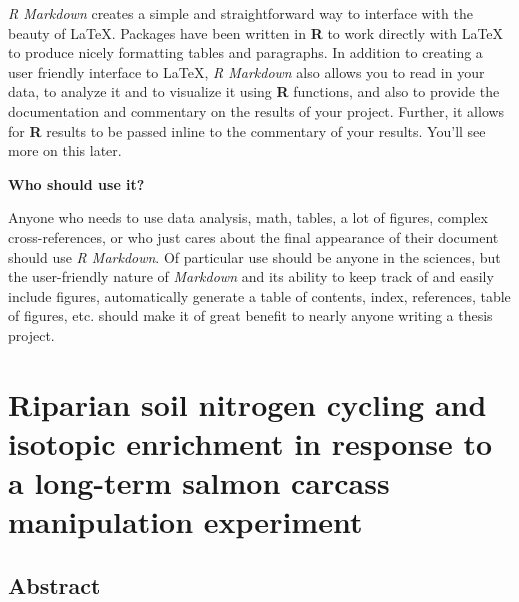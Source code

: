 \documentclass [11pt, proquest] {uwthesis}[2015/03/03]
\begin{document}
\emph{R Markdown} creates a simple and straightforward way to interface with the beauty of LaTeX. Packages have been written in \textbf{R} to work directly with LaTeX to produce nicely formatting tables and paragraphs. In addition to creating a user friendly interface to LaTeX, \emph{R Markdown} also allows you to read in your data, to analyze it and to visualize it using \textbf{R} functions, and also to provide the documentation and commentary on the results of your project. Further, it allows for \textbf{R} results to be passed inline to the commentary of your results. You'll see more on this later.

\textbf{Who should use it?}

Anyone who needs to use data analysis, math, tables, a lot of figures, complex cross-references, or who just cares about the final appearance of their document should use \emph{R Markdown}. Of particular use should be anyone in the sciences, but the user-friendly nature of \emph{Markdown} and its ability to keep track of and easily include figures, automatically generate a table of contents, index, references, table of figures, etc. should make it of great benefit to nearly anyone writing a thesis project.

\hypertarget{riparian-soil-nitrogen-cycling-and-isotopic-enrichment-in-response-to-a-long-term-salmon-carcass-manipulation-experiment}{%
\chapter{Riparian soil nitrogen cycling and isotopic enrichment in response to a long-term salmon carcass manipulation experiment}\label{riparian-soil-nitrogen-cycling-and-isotopic-enrichment-in-response-to-a-long-term-salmon-carcass-manipulation-experiment}}

\hypertarget{abstract}{%
\section{Abstract}\label{abstract}}
\end{document}

